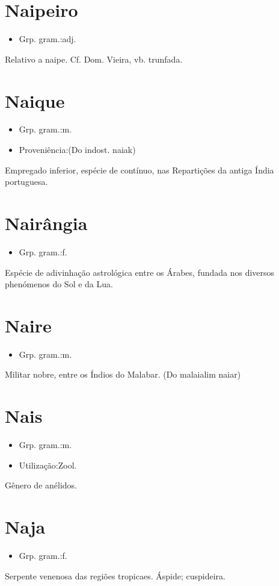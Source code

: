 \section{Naipeiro}
\begin{itemize}
\item {Grp. gram.:adj.}
\end{itemize}
Relativo a naipe. Cf. Dom. Vieira, vb. \textunderscore trunfada\textunderscore .
\section{Naique}
\begin{itemize}
\item {Grp. gram.:m.}
\end{itemize}
\begin{itemize}
\item {Proveniência:(Do indost. \textunderscore naiak\textunderscore )}
\end{itemize}
Empregado inferior, espécie de contínuo, nas Repartições da antiga Índia portuguesa.
\section{Nairângia}
\begin{itemize}
\item {Grp. gram.:f.}
\end{itemize}
Espécie de adivinhação astrológica entre os Árabes, fundada nos diversos phenómenos do Sol e da Lua.
\section{Naire}
\begin{itemize}
\item {Grp. gram.:m.}
\end{itemize}
Militar nobre, entre os Índios do Malabar.
(Do malaialim \textunderscore naiar\textunderscore )
\section{Nais}
\begin{itemize}
\item {Grp. gram.:m.}
\end{itemize}
\begin{itemize}
\item {Utilização:Zool.}
\end{itemize}
Gênero de anélidos.
\section{Naja}
\begin{itemize}
\item {Grp. gram.:f.}
\end{itemize}
Serpente venenosa das regiões tropicaes.
Áspide; cuspideira.
